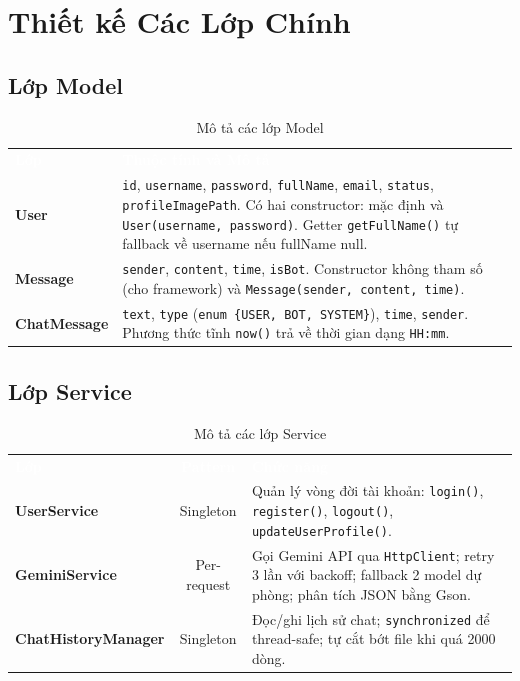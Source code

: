 \documentclass[12pt, a4paper, oneside]{report}
\newcommand{\code}[1]{\texttt{\color{hustblue!80!black}#1}}
\newcommand{\rA}{\rowcolor{rowA}}
\newcommand{\rB}{\rowcolor{rowB}}
\begin{document}
\section{Thiết kế Các Lớp Chính}

\subsection{Lớp Model}

\begin{table}[H]
  \centering
  \caption{Mô tả các lớp Model}
  \label{tab:models}
  \begin{tabularx}{\linewidth}{>{\bfseries\ttfamily\color{hustblue}}l X}
    \rowcolor{headerrow}
    \textcolor{white}{\textbf{Lớp}} &
    \textcolor{white}{\textbf{Thuộc tính và Mô tả}} \\
    \rA User &
      \code{id}, \code{username}, \code{password}, \code{fullName},
      \code{email}, \code{status}, \code{profileImagePath}.
      Có hai constructor: mặc định và \code{User(username, password)}.
      Getter \code{getFullName()} tự fallback về username nếu fullName null. \\
    \rB Message &
      \code{sender}, \code{content}, \code{time}, \code{isBot}.
      Constructor không tham số (cho framework) và
      \code{Message(sender, content, time)}. \\
    \rA ChatMessage &
      \code{text}, \code{type} (\code{enum \{USER, BOT, SYSTEM\}}),
      \code{time}, \code{sender}.
      Phương thức tĩnh \code{now()} trả về thời gian dạng \code{HH:mm}. \\
  \end{tabularx}
\end{table}

\subsection{Lớp Service}

\begin{table}[H]
  \centering
  \caption{Mô tả các lớp Service}
  \label{tab:services}
  \begin{tabularx}{\linewidth}{>{\bfseries\ttfamily\color{hustblue}}l c X}
    \rowcolor{headerrow}
    \textcolor{white}{\textbf{Lớp}} &
    \textcolor{white}{\textbf{Pattern}} &
    \textcolor{white}{\textbf{Chức năng}} \\
    \rA UserService &
      Singleton &
      Quản lý vòng đời tài khoản: \code{login()}, \code{register()},
      \code{logout()}, \code{updateUserProfile()}. \\
    \rB GeminiService &
      Per-request &
      Gọi Gemini API qua \code{HttpClient}; retry 3 lần với backoff;
      fallback 2 model dự phòng; phân tích JSON bằng Gson. \\
    \rA ChatHistoryManager &
      Singleton &
      Đọc/ghi lịch sử chat; \code{synchronized} để thread-safe;
      tự cắt bớt file khi quá 2000 dòng. \\
  \end{tabularx}
\end{table}
\end{document}
